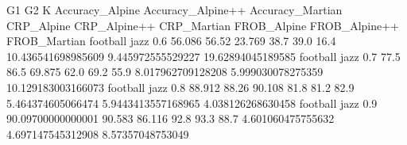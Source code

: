 G1 G2 K Accuracy_Alpine Accuracy_Alpine++ Accuracy_Martian CRP_Alpine CRP_Alpine++ CRP_Martian FROB_Alpine FROB_Alpine++ FROB_Martian
football jazz 0.6 56.086 56.52 23.769 38.7 39.0 16.4 10.436541698985609 9.445972555529227 19.62894045189585
football jazz 0.7 77.5 86.5 69.875 62.0 69.2 55.9 8.017962709128208 5.999030078275359 10.129183003166073
football jazz 0.8 88.912 88.26 90.108 81.8 81.2 82.9 5.464374605066474 5.9443413557168965 4.038126268630458
football jazz 0.9 90.09700000000001 90.583 86.116 92.8 93.3 88.7 4.601060475755632 4.697147545312908 8.57357048753049
